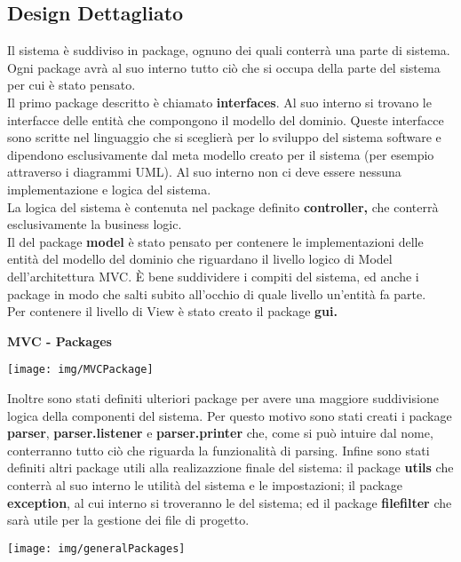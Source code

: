 \documentclass{article}
\begin{document}
  \subsection{Design Dettagliato}
  Il sistema è suddiviso in package, ognuno dei quali conterrà una parte di sistema.\\
  Ogni package avrà al suo interno tutto ciò che si occupa della parte del sistema per cui è stato pensato.
  \\Il primo package descritto è chiamato \textbf{interfaces}. Al suo interno si trovano le interfacce delle entità che compongono il modello del dominio. Queste
  interfacce sono scritte nel linguaggio che si sceglierà per lo sviluppo del sistema software e dipendono esclusivamente dal meta modello creato per il sistema (per esempio
  attraverso i diagrammi UML). Al suo interno non ci deve essere nessuna implementazione e logica del sistema.\\
  La logica del sistema è contenuta nel package definito \textbf{controller,} che conterrà esclusivamente la business logic.\\
  Il del package \textbf{model} è stato pensato per contenere le implementazioni delle entità del modello del dominio che riguardano il livello logico di Model
  dell'architettura MVC. È bene suddividere i compiti del sistema, ed anche i package in modo che salti subito all'occhio di quale livello un'entità fa parte.\\
  Per contenere il livello di View è stato creato il package \textbf{gui.}
  \begin{framed}
    \centering
    \begin{center}
      \textbf{MVC - Packages}\par\medskip
      \texttt{[image: img/MVCPackage]}
    \end{center}
  \end{framed}
  Inoltre sono stati definiti ulteriori package per avere una maggiore suddivisione logica della componenti del sistema. Per questo motivo sono stati creati i package
  \textbf{parser}, \textbf{parser.listener} e \textbf{parser.printer} che, come si può intuire dal nome, conterranno tutto ciò che riguarda la funzionalità di parsing.
  Infine sono stati definiti altri package utili alla realizazzione finale del sistema: il package \textbf{utils} che conterrà al suo interno le utilità del sistema
  e le impostazioni; il package \textbf{exception}, al cui interno si troveranno le del sistema; ed il package \textbf{filefilter} che sarà utile per la gestione dei file
  di progetto.
  \begin{framed}
    \centering
    \begin{center}
      \texttt{[image: img/generalPackages]}
    \end{center}
  \end{framed}
\end{document}
